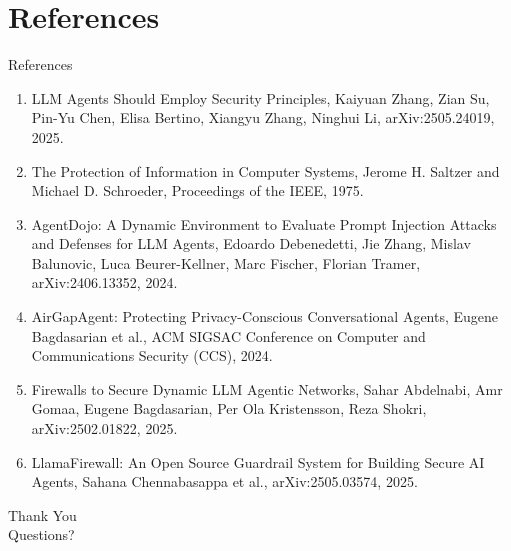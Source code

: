 \documentclass[10pt]{beamer}
\begin{document}
\section{References}
\begin{frame}[allowframebreaks]{References}
  \footnotesize
  \begin{enumerate}
    \item LLM Agents Should Employ Security Principles, Kaiyuan Zhang, Zian Su, Pin-Yu Chen, Elisa Bertino, Xiangyu Zhang, Ninghui Li, arXiv:2505.24019, 2025.
    \item The Protection of Information in Computer Systems, Jerome H. Saltzer and Michael D. Schroeder, Proceedings of the IEEE, 1975.
    \item AgentDojo: A Dynamic Environment to Evaluate Prompt Injection Attacks and Defenses for LLM Agents, Edoardo Debenedetti, Jie Zhang, Mislav Balunovic, Luca Beurer-Kellner, Marc Fischer, Florian Tramer, arXiv:2406.13352, 2024.
    \item AirGapAgent: Protecting Privacy-Conscious Conversational Agents, Eugene Bagdasarian et al., ACM SIGSAC Conference on Computer and Communications Security (CCS), 2024.
    \item Firewalls to Secure Dynamic LLM Agentic Networks, Sahar Abdelnabi, Amr Gomaa, Eugene Bagdasarian, Per Ola Kristensson, Reza Shokri, arXiv:2502.01822, 2025.
    \item LlamaFirewall: An Open Source Guardrail System for Building Secure AI Agents, Sahana Chennabasappa et al., arXiv:2505.03574, 2025.
  \end{enumerate}
\end{frame}

\begin{frame}[plain]
  \begin{center}
    {\Huge Thank You}\\[1em]
    {\large Questions?}
  \end{center}
\end{frame}
\end{document}
